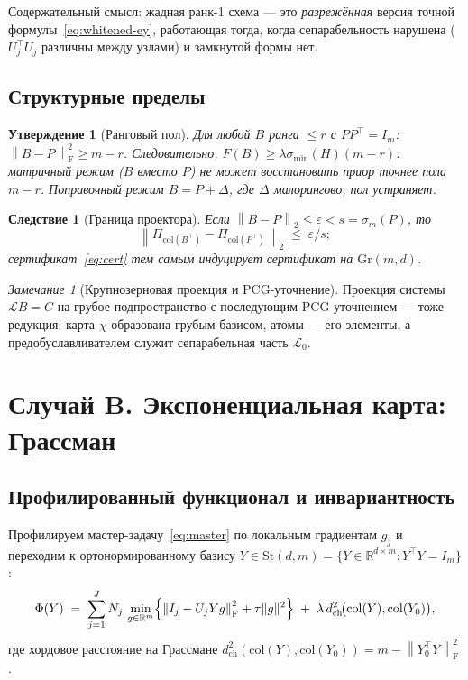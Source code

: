 \documentclass[11pt,a4paper]{article}
\newcommand{\R}{\mathbb{R}}
\newcommand{\Id}{I}
\newcommand{\T}{^{\!\top}}
\newcommand{\F}{\mathrm{F}}
\newcommand{\Gr}{\mathrm{Gr}}
\newcommand{\St}{\mathrm{St}}
\newcommand{\col}{\mathrm{col}}
\newcommand{\Lop}{\mathcal{L}}
\newcommand{\dch}{d_{\mathrm{ch}}}
\newcommand{\erm}[1]{\left\|#1\right\|_{\F}}
\newcommand{\opn}[1]{\left\|#1\right\|_{2}}
\theoremstyle{plain}
\newtheorem{prop}[theorem]{Утверждение}
\newtheorem{corollary}[theorem]{Следствие}
\theoremstyle{definition}
\theoremstyle{remark}
\newtheorem{remark}[theorem]{Замечание}
\begin{document}
Содержательный смысл: жадная ранк-1 схема --- это \emph{разрежённая} версия
точной формулы~\eqref{eq:whitened-ey}, работающая тогда, когда сепарабельность
нарушена ($U_j\T U_j$ различны между узлами) и замкнутой формы нет.

\subsection{Структурные пределы}

\begin{prop}[Ранговый пол]\label{prop:rank-floor}
Для любой $B$ ранга $\le r$ с $PP\T=\Id_m$:
$\erm{B-P}^2\ge m-r$. Следовательно, $F(B)\ge\lambda\sigma_{\min}(H)(m-r)$:
\emph{матричный} режим ($B$ вместо $P$) не может восстановить приор точнее
пола $m-r$. Поправочный режим $B=P+\Delta$, где $\Delta$ малорангово, пол
устраняет.
\end{prop}

\begin{corollary}[Граница проектора]\label{cor:proj}
Если $\opn{B-P}\le\varepsilon<s=\sigma_m(P)$, то
\[
\opn{\Pi_{\col(B\T)}-\Pi_{\col(P\T)}}\;\le\;\varepsilon/s ;
\]
сертификат~\eqref{eq:cert} тем самым индуцирует сертификат на $\Gr(m,d)$.
\end{corollary}

\begin{remark}[Крупнозерновая проекция и PCG-уточнение]
Проекция системы $\Lop B=C$ на грубое подпространство с последующим
PCG-уточнением --- тоже редукция: карта $\chi$ образована грубым
базисом, атомы --- его элементы, а предобуславливателем служит
сепарабельная часть $\Lop_0$.
\end{remark}

\section{Случай B. Экспоненциальная карта: Грассман}\label{sec:grass}

\subsection{Профилированный функционал и инвариантность}

Профилируем мастер-задачу~\eqref{eq:master} по локальным градиентам $g_j$ и
переходим к ортонормированному базису $Y\in\St(d,m)=\{Y\in\R^{d\times m}:Y\T Y=\Id_m\}$:
\begin{equation}\label{eq:grass-profile}
\Phi(Y)\;=\;\sum_{j=1}^{J}N_j\,\min_{g\in\R^m}\Bigl\{\erm{I_j-U_jYg}^2+\tau\|g\|^2\Bigr\}
\;+\;\lambda\,\dch^2\!\bigl(\col(Y),\col(Y_0)\bigr),
\end{equation}
где хордовое расстояние на Грассмане
$\dch^2(\col(Y),\col(Y_0))=m-\erm{Y_0\T Y}^2$.
\end{document}
